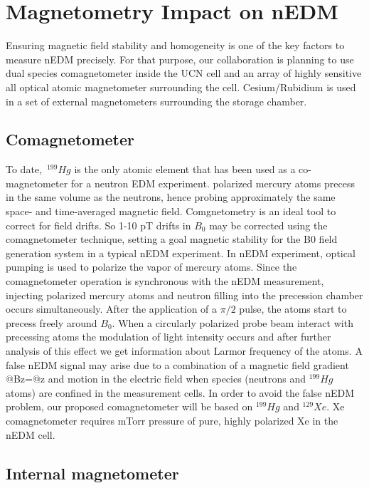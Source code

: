 \section{ Magnetometry Impact on nEDM}
Ensuring magnetic field stability and homogeneity is one of the key factors to measure nEDM precisely. For that purpose, our collaboration is planning to use dual species comagnetometer inside the UCN cell and an array of highly sensitive all optical atomic magnetometer surrounding the cell. Cesium/Rubidium is used in a set of external magnetometers surrounding the storage chamber.
\subsection{Comagnetometer}
To date,~$^{199}Hg$ is the only atomic element that has been used as a co-magnetometer for a neutron EDM experiment\cite{PhysRevLett.97.131801}\cite{PhysRevLett.102.101601}.  polarized mercury atoms precess in the same volume as the neutrons, hence probing approximately the same space- and time-averaged magnetic field.  Comgnetometry is an ideal tool to correct for field drifts.  So 1-10 pT drifts in $B_0$  may be corrected using the comagnetometer technique, setting a goal magnetic stability for the B0  field generation system in a typical nEDM experiment\cite{PhysRevLett.97.131801}\cite{afach:in2p3-01062292}. In nEDM experiment, optical pumping is used to polarize the vapor of mercury atoms. Since the comagnetometer operation is synchronous with the nEDM measurement, injecting polarized mercury atoms and  neutron filling into the precession chamber occurs simultaneously. After the application of a $\pi/2$ pulse, the atoms start to precess freely around $B_0$. When a circularly polarized probe beam interact with precessing atoms the modulation of light intensity occurs and after further analysis of  this effect we get information about Larmor frequency of the atoms. A false nEDM signal may arise due to a combination of a magnetic field gradient @Bz=@z and motion in the electric field when species (neutrons and $^{199}Hg$ atoms) are confined in the measurement cells. In order to avoid the false nEDM problem, our proposed comagnetometer will be based on $^{199}Hg$ and $^{129}Xe$. Xe comagnetometer requires mTorr pressure of pure,
highly polarized Xe in the nEDM cell.
\subsection{Internal magnetometer}


